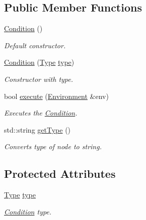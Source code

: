 \subsection*{Public Member Functions}
\begin{DoxyCompactItemize}
\item 
\hypertarget{classCondition_af11513db4fcbde93961fa0b65e7ab764}{}\hyperlink{classCondition_af11513db4fcbde93961fa0b65e7ab764}{Condition} ()\label{classCondition_af11513db4fcbde93961fa0b65e7ab764}

\begin{DoxyCompactList}\small\item\em Default constructor. \end{DoxyCompactList}\item 
\hyperlink{classCondition_adffecd1d1fac2e3e75e190c63b409dd1}{Condition} (\hyperlink{classCondition_a3eed4b7ef94da5dda4a3353cffa8266e}{Type} \hyperlink{classCondition_aeebc812b5f02a5e017c26d4573e85530}{type})
\begin{DoxyCompactList}\small\item\em Constructor with type. \end{DoxyCompactList}\item 
bool \hyperlink{classCondition_a4660fd89788efc03c57c35f66e14ae5b}{execute} (\hyperlink{classEnvironment}{Environment} \&env)
\begin{DoxyCompactList}\small\item\em Executes the \hyperlink{classCondition}{Condition}. \end{DoxyCompactList}\item 
std\+::string \hyperlink{classCondition_addf79a820326e04e58937c9875afe181}{get\+Type} ()
\begin{DoxyCompactList}\small\item\em Converts type of node to string. \end{DoxyCompactList}\end{DoxyCompactItemize}
\subsection*{Protected Attributes}
\begin{DoxyCompactItemize}
\item 
\hypertarget{classCondition_aeebc812b5f02a5e017c26d4573e85530}{}\hyperlink{classCondition_a3eed4b7ef94da5dda4a3353cffa8266e}{Type} \hyperlink{classCondition_aeebc812b5f02a5e017c26d4573e85530}{type}\label{classCondition_aeebc812b5f02a5e017c26d4573e85530}

\begin{DoxyCompactList}\small\item\em \hyperlink{classCondition}{Condition} type. \end{DoxyCompactList}\end{DoxyCompactItemize}


